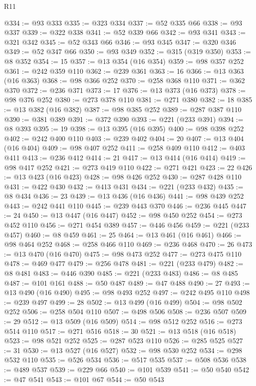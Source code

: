 \begin{lexlean}{R11}
\begin{coremodule}
@334 := @93 @333
@335 := @323 @334
@337 := @52 @335 @66
@338 := @93 @337
@339 := @322 @338
@341 := @52 @339 @66
@342 := @93 @341
@343 := @321 @342
@345 := @52 @343 @66
@346 := @93 @345
@347 := @320 @346
@349 := @52 @347 @66
@350 := @93 @349
@352 := @315 (@319 @350)
@353 := @8 @352
@354 := 15
@357 := @13 @354 (@16 @354)
@359 := @98 @357 @252
@361 := @242 @359 @110
@362 := @239 @361
@363 := 16
@366 := @13 @363 (@16 @363)
@368 := @98 @366 @252
@370 := @258 @368 @110
@371 := @362 @370
@372 := @236 @371
@373 := 17
@376 := @13 @373 (@16 @373)
@378 := @98 @376 @252
@380 := @273 @378 @110
@381 := @271 @380
@382 := 18
@385 := @13 @382 (@16 @382)
@387 := @98 @385 @252
@389 := @287 @387 @110
@390 := @381 @389
@391 := @372 @390
@393 := @221 (@233 @391)
@394 := @8 @393
@395 := 19
@398 := @13 @395 (@16 @395)
@400 := @98 @398 @252
@402 := @242 @400 @110
@403 := @239 @402
@404 := 20
@407 := @13 @404 (@16 @404)
@409 := @98 @407 @252
@411 := @258 @409 @110
@412 := @403 @411
@413 := @236 @412
@414 := 21
@417 := @13 @414 (@16 @414)
@419 := @98 @417 @252
@421 := @273 @419 @110
@422 := @271 @421
@423 := 22
@426 := @13 @423 (@16 @423)
@428 := @98 @426 @252
@430 := @287 @428 @110
@431 := @422 @430
@432 := @413 @431
@434 := @221 (@233 @432)
@435 := @8 @434
@436 := 23
@439 := @13 @436 (@16 @436)
@441 := @98 @439 @252
@443 := @242 @441 @110
@445 := @239 @443 @370
@446 := @236 @445
@447 := 24
@450 := @13 @447 (@16 @447)
@452 := @98 @450 @252
@454 := @273 @452 @110
@456 := @271 @454 @389
@457 := @446 @456
@459 := @221 (@233 @457)
@460 := @8 @459
@461 := 25
@464 := @13 @461 (@16 @461)
@466 := @98 @464 @252
@468 := @258 @466 @110
@469 := @236 @468
@470 := 26
@473 := @13 @470 (@16 @470)
@475 := @98 @473 @252
@477 := @273 @475 @110
@478 := @469 @477
@479 := @256 @478
@481 := @221 (@233 @479)
@482 := @8 @481
@483 := @446 @390
@485 := @221 (@233 @483)
@486 := @8 @485
@487 := @101 @161
@488 := @50 @487
@489 := @47 @488
@490 := 27
@493 := @13 @490 (@16 @490)
@495 := @98 @493 @252
@497 := @242 @495 @110
@498 := @239 @497
@499 := 28
@502 := @13 @499 (@16 @499)
@504 := @98 @502 @252
@506 := @258 @504 @110
@507 := @498 @506
@508 := @236 @507
@509 := 29
@512 := @13 @509 (@16 @509)
@514 := @98 @512 @252
@516 := @273 @514 @110
@517 := @271 @516
@518 := 30
@521 := @13 @518 (@16 @518)
@523 := @98 @521 @252
@525 := @287 @523 @110
@526 := @285 @525
@527 := 31
@530 := @13 @527 (@16 @527)
@532 := @98 @530 @252
@534 := @298 @532 @110
@535 := @526 @534
@536 := @517 @535
@537 := @508 @536
@538 := @489 @537
@539 := @229 @66
@540 := @101 @539
@541 := @50 @540
@542 := @47 @541
@543 := @101 @67
@544 := @50 @543

\end{coremodule}
\end{lexlean}
